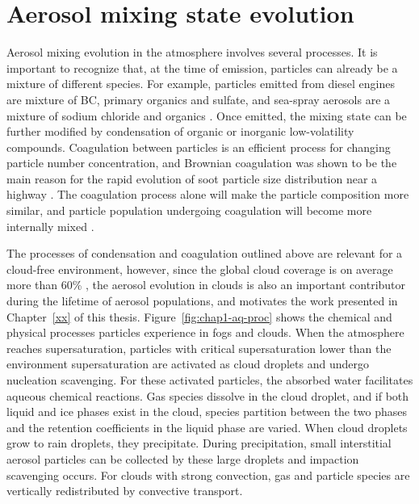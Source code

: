 \documentclass[edeposit,fullpage]{uiucthesis2009}
\begin{document}
\section{Aerosol mixing state evolution}  
Aerosol mixing evolution in the atmosphere involves several
processes. It is important to recognize that, at the time of emission,
particles can already be a mixture of different species. For example,
particles emitted from diesel engines are mixture of BC, primary
organics and sulfate, and sea-spray aerosols are a mixture of sodium
chloride and organics \citep{cheung2010emissions,
  kirpes2018secondary}. Once emitted, the mixing state can be further
modified by condensation of organic or inorganic low-volatility
compounds.
Coagulation between particles is an efficient process for changing
particle number concentration, and Brownian coagulation was shown to
be the main reason for the rapid evolution of soot particle size
distribution near a highway \citep{jacobson2004evolution}. The
coagulation process alone will make the particle composition more
similar, and particle population undergoing coagulation will become
more internally mixed \citep{Riemer2013a}.

The processes of condensation and coagulation outlined above are
relevant for a cloud-free environment, however, since the global cloud
coverage is on average more than 60\%
\citep{stubenrauch2013assessment}, the aerosol evolution in clouds is
also an important contributor during the lifetime of aerosol
populations, and motivates the work presented in Chapter~\ref{xx} of
this thesis. Figure~\ref{fig:chap1-aq-proc} shows the chemical and
physical processes particles experience in fogs and clouds. When the
atmosphere reaches supersaturation, particles with critical
supersaturation lower than the environment supersaturation are
activated as cloud droplets and undergo nucleation scavenging. For
these activated particles, the absorbed water facilitates aqueous
chemical reactions. Gas species dissolve in the cloud droplet, and if
both liquid and ice phases exist in the cloud, species partition
between the two phases and the retention coefficients in the liquid
phase are varied. When cloud droplets grow to rain droplets, they
precipitate. During precipitation, small interstitial aerosol
particles can be collected by these large droplets and impaction
scavenging occurs. For clouds with strong convection, gas and particle
species are vertically redistributed by convective transport.
\end{document}
